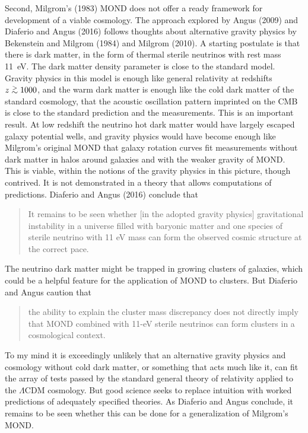 \documentclass[fleqn,12pt]{article}
\def\gap{\lower.5ex\hbox{$\; \buildrel > \over \sim \;$}}
\begin{document}
Second, Milgrom's (1983) MOND does not offer a ready framework for development of a viable cosmology. The approach explored by Angus (2009) and Diaferio and Angus (2016) follows thoughts about alternative gravity physics by Bekenstein and Milgrom (1984) and Milgrom (2010). A starting  postulate is that there is dark matter, in the form of thermal sterile neutrinos with rest mass 11~eV. The dark matter density parameter is close to the standard model. Gravity physics in this model is enough like general relativity at redshifts $z \gap 1000$, and the warm dark matter is enough like the cold dark matter of the standard cosmology, that the acoustic oscillation pattern imprinted on the CMB is close to the standard prediction and the measurements. This is an important result. At low redshift the neutrino hot dark matter would have largely escaped galaxy potential wells, and gravity physics would have become enough like Milgrom's original MOND that galaxy rotation curves fit measurements without dark matter in halos around galaxies and with the weaker gravity of MOND. This is viable, within the notions of the gravity physics in this picture, though contrived. It is not demonstrated in a theory that allows computations of predictions. Diaferio and Angus (2016) conclude that
\begin{quotation}
It remains to be seen whether [in the adopted gravity physics] gravitational instability in a universe filled with baryonic matter and one species of sterile neutrino with 11 eV mass can form the observed cosmic structure at the correct pace.
\end{quotation}
The neutrino dark matter might be trapped in growing clusters of galaxies, which could be a helpful feature for the application of MOND to clusters. But Diaferio and Angus caution that 
\begin{quotation}
 the ability to explain the cluster mass discrepancy does not directly imply that MOND combined with 11-eV sterile neutrinos can form clusters in a cosmological context.
\end{quotation}
 
To my mind it is exceedingly unlikely that an alternative gravity physics and cosmology without cold dark matter, or something that acts much like it, can fit the array of tests passed by the standard general theory of relativity applied to the $\Lambda$CDM cosmology. But good science seeks to replace intuition with worked predictions of adequately specified theories. As Diaferio and Angus conclude, it remains to be seen whether this can be done for a generalization of Milgrom's MOND. 
\end{document}
